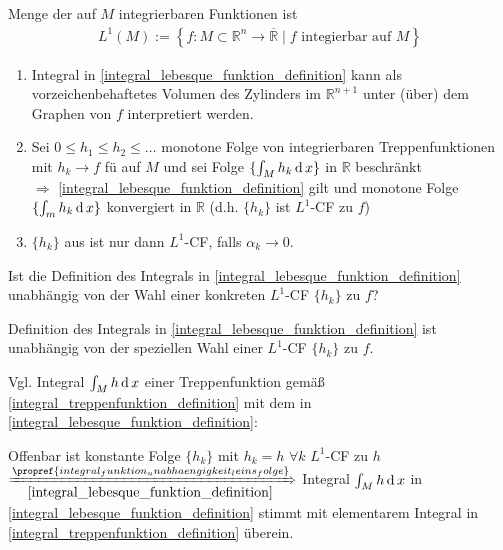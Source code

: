 \begin{*definition}
Menge der auf $M$ integrierbaren Funktionen ist  \begin{align*}
	L^1(M) := \left\{ f:M\subset\mathbb{R}^n\to\overline{\mathbb{R}} \mid f \text{ integierbar auf $M$} \right\}
\end{align*}
\end{*definition}

\begin{remark}\vspace*{0pt}
	\begin{enumerate}[label={\alph*)},topsep=\dimexpr -\baselineskip / 2\relax]
		\item Integral in \eqref{integral_lebesque_funktion_definition} kann als vorzeichenbehaftetes Volumen des Zylinders im $\mathbb{R}^{n+1}$ unter (über) dem Graphen von $f$ interpretiert werden.
		\item Sei $0\le h_1 \le h_2 \le \dotsc$ monotone Folge von integrierbaren Treppenfunktionen mit $h_k\to f$ \gls{fü} auf $M$ und sei Folge $\{ \int_M h_k\operatorname{d} x\}$ in $\mathbb{R}$ beschränkt \\
		$\Rightarrow$ \eqref{integral_lebesque_funktion_definition} gilt und monotone Folge $\{ \int_m h_k \operatorname{d} x \}$ konvergiert in $\mathbb{R}$ (d.h. $\{ h_k \}$ ist $L^1$-CF zu $f$)
		\item $\{ h_k\}$ aus  ist nur dann $L^1$-CF, falls $\alpha_k\to 0$.
	\end{enumerate}
\end{remark}

\begin{underlinedenvironment}[Frage]
	Ist die Definition des Integrals in \eqref{integral_lebesque_funktion_definition} unabhängig von der Wahl einer konkreten $L^1$-CF $\{ h_k\}$ zu $f$?
\end{underlinedenvironment}

\begin{proposition}
	Definition des Integrals in \eqref{integral_lebesque_funktion_definition} ist unabhängig von der speziellen Wahl einer $L^1$-CF $\{h_k\}$ zu $f$.
\end{proposition}

Vgl. Integral $\int_{M} h \operatorname{d} x$ einer Treppenfunktion gemäß \eqref{integral_treppenfunktion_definition} mit dem in \eqref{integral_lebesque_funktion_definition}:

Offenbar ist konstante Folge $\{ h_k\}$ mit $h_k = h$ $\forall k$ $L^1$-CF zu $h$ \\
$\xRightarrow[\eqref{integral_lebesque_funktion_definition}]{\footnotesize\propref{integral_funktion_unabhaengigkeit_leins_folge}}$ Integral $\int_M h \operatorname{d} x$ in \eqref{integral_lebesque_funktion_definition} stimmt mit elementarem Integral in \eqref{integral_treppenfunktion_definition} überein.

